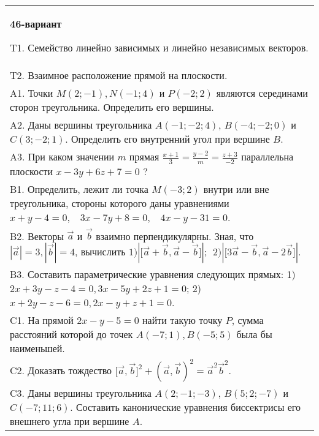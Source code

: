 \documentclass{article}
\begin{document}
\begin{tabular}{m{17cm}}
\textbf{46-вариант}
\newline

T1. 
Семейство линейно зависимых и линейно независимых векторов.
 \\
T2. 
Взаимное расположение прямой на плоскости.
 \\
A1. 
Точки \(M(2; - 1),N( - 1;4)\) и \(P( - 2;2)\) являются серединами сторон треугольника. Определить его вершины.
 \\
A2. 
Даны вершины треугольника \(A( - 1; - 2;4)\), \(B( - 4; - 2;0)\) и \(C(3; - 2;1)\). Определить его внутренний угол при вершине \(B\).
 \\
A3. 
При каком значении \(m\) прямая \(\frac{x + 1}{3} = \frac{y - 2}{m} = \frac{z + 3}{- 2}\) параллельна плоскости \(x - 3y + 6z + 7 = 0\) ?
 \\
B1. 
Определить, лежит ли точка \(M( - 3;2)\) внутри или вне треугольника, стороны которого даны уравнениями \(x + y - 4 = 0,\ \ \ \ 3x - 7y + 8 = 0,\ \ \ \ 4x - y - 31 = 0\).
 \\
B2. 
Векторы \(\overrightarrow{a}\) и \(\overrightarrow{b}\) взаимно перпендикулярны. Зная, что \(|\overrightarrow{a}| = 3,|\overrightarrow{b}| = 4\), вычислить \(1)|\lbrack\overrightarrow{a} + \overrightarrow{b},\overrightarrow{a} - \overrightarrow{b}\rbrack|;\ \ 2)|\lbrack 3\overrightarrow{a} - \overrightarrow{b},\overrightarrow{a} - 2\overrightarrow{b}\rbrack|\).
 \\
B3. 
Составить параметрические уравнения следующих прямых: 1) \(2x + 3y - z - 4 = 0,3x - 5y + 2z + 1 = 0\); 2) \(x + 2y - z - 6 = 0,2x - y + z + 1 = 0\).
 \\
C1. 
На прямой \(2x - y - 5 = 0\) найти такую точку \(P\), сумма расстояний которой до точек \(A( - 7;1),B( - 5;5)\) была бы наименьшей.
 \\
C2. 
Доказать тождество \(\lbrack\overrightarrow{a},\overrightarrow{b}\rbrack^{2} + (\overrightarrow{a},\overrightarrow{b})^{2} = {\overrightarrow{a}}^{2}{\overrightarrow{b}}^{2}\).
 \\
C3. 
Даны вершины треугольника \(A(2; - 1; - 3)\), \(B(5;2; - 7)\) и \(C( - 7;11;6)\). Составить канонические уравнения биссектрисы его внешнего угла при вершине \(A\).
 \\

\end{tabular}
\vspace{1cm}
\end{document}

